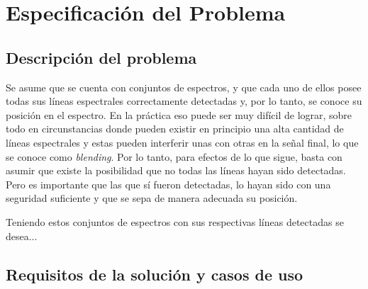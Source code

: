 \chapter{Especificación del Problema}


\section{Descripción del problema}


Se asume que se cuenta con conjuntos de espectros, y que cada uno de ellos posee todas sus líneas espectrales correctamente detectadas y, por lo tanto, se conoce su posición en el espectro. En la práctica eso puede ser muy difícil de lograr, sobre todo en circunstancias donde pueden existir en principio una alta cantidad de líneas espectrales y estas pueden interferir unas con otras en la señal final, lo que se conoce como \textit{blending}. Por lo tanto, para efectos de lo que sigue, basta con asumir que existe la posibilidad que no todas las líneas hayan sido detectadas. Pero es importante que las que sí fueron detectadas, lo hayan sido con una seguridad suficiente y que se sepa de manera adecuada su posición.

Teniendo estos conjuntos de espectros con sus respectivas líneas detectadas se desea... 


\section{Requisitos de la solución y casos de uso}


